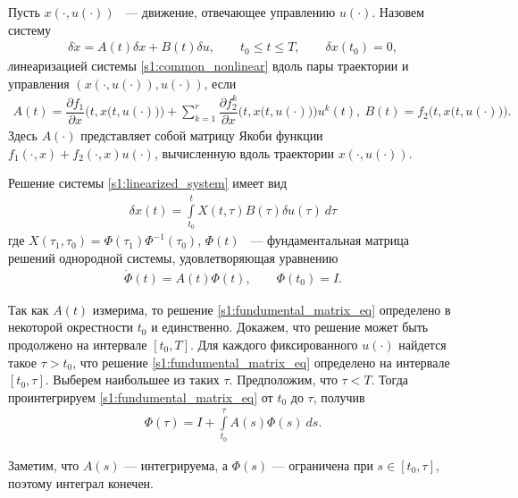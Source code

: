 \documentclass[../main.tex]{subfiles}
\begin{document}
\begin{definition}\label{s1:def:linearized_system}
 Пусть $ x(\cdot,u(\cdot)) $ ~--- движение, отвечающее управлению $ u(\cdot)$.
 Назовем систему
 \begin{gather}\label{s1:linearized_system}
 \delta \dot{x} = A(t) \delta x + B(t) \delta u, \qquad t_0 \leqslant t \leqslant T, \qquad \delta x(t_0) = 0,
 \end{gather}
 {\textit линеаризацией} системы \eqref{s1:common_nonlinear} вдоль пары траектории и управления $\left( x(\cdot,u(\cdot)),u(\cdot)\right) $, если 
 \begin{gather*}
 A(t) = \dfrac{\partial f_1}{\partial x} \Big(t,x\big(t,u(\cdot)\big)\Big) 
 + 
 \sum\limits_{k = 1}^{r}
 \dfrac{\partial f_2^k}{\partial x}\Big(t,x\big(t,u(\cdot)\big)\Big) u^k(t), \ 
 B(t) = f_2 \Big(t,x\big(t,u(\cdot)\big)\Big).
 \end{gather*}
 Здесь $ A(\cdot) $ представляет собой матрицу Якоби функции $ f_1(\cdot, x) + f_2(\cdot, x) u(\cdot) $, вычисленную вдоль траектории $ x(\cdot,u(\cdot)) $.
\end{definition}

Решение системы \eqref{s1:linearized_system} имеет вид 
\begin{gather*}
\delta x(t) = \int\limits_{t_0}^{t} X(t, \tau) B(\tau) \delta u(\tau) \ d\tau 
\end{gather*}
 где $ X(\tau_1,\tau_0)= \Phi(\tau_1) \Phi^{-1}(\tau_0) $, $\Phi(t) $ ~--- фундаментальная матрица решений однородной системы, удовлетворяющая уравнению 
\begin{gather}\label{s1:fundumental_matrix_eq}
 \dot{\Phi}(t) = A(t) \Phi(t), \qquad \Phi(t_0) = I.
\end{gather}

Так как $A(t)$ измерима, то решение \eqref{s1:fundumental_matrix_eq} определено в некоторой окрестности $t_0$ и единственно\cite[с. 46]{Filippov2}. 
Докажем, что решение может быть продолжено на интервале $[t_0, T]$. 
Для каждого фиксированного $u(\cdot) $ найдется такое $\tau > t_0$, что решение \eqref{s1:fundumental_matrix_eq} определено на интервале $ [t_0, \tau] $.
Выберем наибольшее из таких $\tau$.
Предположим, что $\tau < T$. 
Тогда проинтегрируем \eqref{s1:fundumental_matrix_eq} от $t_0$ до $\tau$, получив
\begin{gather*}
 \Phi(\tau) = I + \int\limits_{t_0}^{\tau} A(s) \Phi(s) \ ds.
\end{gather*}

Заметим, что $A(s)$ --- интегрируема, а $ \Phi(s)$ --- ограничена при $s \in [t_0, \tau]$, поэтому интеграл конечен.
\end{document}
